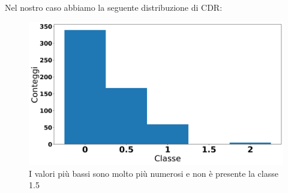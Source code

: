 Nel nostro caso abbiamo la seguente distribuzione di CDR:    
\begin{figure}[H]
	\centering
	\includegraphics[height=0.55 \linewidth]{bar_plot.png}
	\caption{I valori più bassi sono molto più numerosi e non è presente la classe 1.5}
\end{figure}
    
    
    
    
    